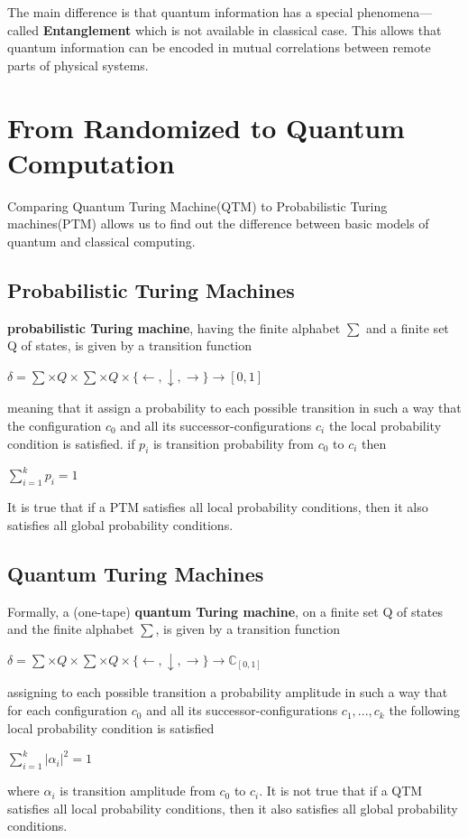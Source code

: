 \documentclass[11 pt]{article}
\theoremstyle{definition}
\theoremstyle{remark}
\begin{document}
The main difference is that quantum information has a special phenomena—called \textbf{Entanglement} which is not available in classical case. This allows that quantum information can be encoded in mutual correlations between remote parts of physical systems.

\section{From Randomized to Quantum Computation}
Comparing Quantum Turing Machine(QTM) to Probabilistic Turing machines(PTM) allows us to find out the difference between basic models of quantum and classical computing. 

\subsection{Probabilistic Turing Machines}
\textbf{probabilistic Turing machine}, having the finite alphabet $\sum$ and a finite set Q of states, is given by a transition function
\begin{center}
$\delta = \sum \times Q \times \sum \times Q \times \{\leftarrow,\downarrow,\rightarrow\} \longrightarrow [0,1]$
\end{center}
meaning that it assign a probability to each possible transition in such a way that the configuration
$c_0$ and all its successor-configurations $c_i$ the local probability condition is satisfied. if $p_i$ is transition probability from $c_0$ to $c_i$ then
\begin{center}
$\sum_{i=1}^{k}p_i = 1$
\end{center}
It is true that if a PTM satisfies all local probability conditions, then it also satisfies
all global probability conditions.

\subsection{Quantum Turing Machines}
Formally, a (one-tape) \textbf{quantum Turing machine}, on a finite set Q of states and the
finite alphabet $\sum$, is given by a transition function
\begin{center}
$\delta = \sum \times Q \times \sum \times Q \times \{\leftarrow,\downarrow,\rightarrow\} \longrightarrow \mathbb{C}_[0,1]$
\end{center}
assigning to each possible transition a probability amplitude in such a way that for each configuration
$c_0$ and all its successor-configurations $c_1, . . ., c_k$ the following local probability condition is satisfied
\begin{center}
$\sum_{i=1}^{k}\left|\alpha_i\right |^2 = 1$
\end{center}
where $\alpha_i$ is transition amplitude from $c_0$ to $c_i$.\newline
It is not true that if a QTM satisfies all local probability conditions, then it also satisfies
all global probability conditions.
\end{document}
